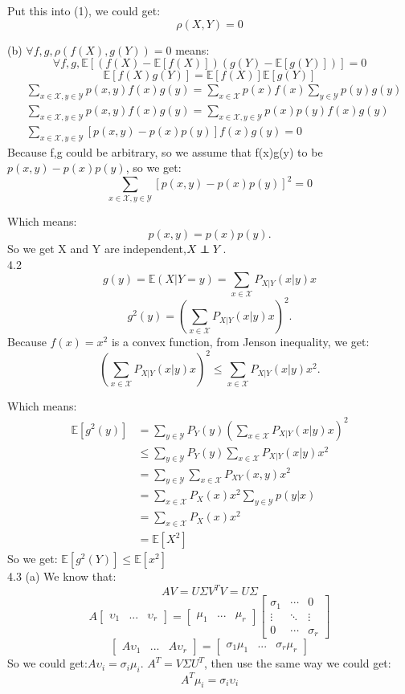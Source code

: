 \documentclass[a4paper]{article}
\begin{document}
Put this into (1), we could get:
$$
\rho(X,Y) = 0
$$

(b) $\forall f,g, \rho (f(X),g(Y)) = 0$ means:
$$
\forall f,g, \mathbb{E}[(f(X)-\mathbb{E}[f(X)])(g(Y)-\mathbb{E}[g(Y)])]= 0
$$
$$\mathbb{E}[f(X)g(Y)] = \mathbb{E}[f(X)]\mathbb{E}[g(Y)]$$
\begin{equation*}
\begin{aligned}
&\sum_{x \in \mathcal{X},y \in \mathcal{Y}} p(x,y)f(x)g(y) = \sum_{x \in \mathcal{X}} p(x)f(x)\sum_{y \in \mathcal{Y}}p(y)g(y)\\
&\sum_{x \in \mathcal{X},y \in \mathcal{Y}} p(x,y)f(x)g(y) = \sum_{x \in \mathcal{X},y \in \mathcal{Y}} p(x)p(y)f(x)g(y)\\
&\sum_{x \in \mathcal{X},y \in \mathcal{Y}} [p(x,y) - p(x)p(y)]f(x)g(y) = 0
\end{aligned}
\end{equation*}
Because f,g could be arbitrary, so we assume that f(x)g(y) to be $p(x,y) - p(x)p(y)$, so we get:
$$
\sum_{x \in \mathcal{X},y \in \mathcal{Y}} [p(x,y) - p(x)p(y)]^2 = 0
$$

Which means:
$$
p(x,y)=p(x)p(y).
$$
So we get X and Y are independent,$X \independent Y$.
$$$$
4.2
$$
g(y) = \mathbb{E}(X|Y=y) = \sum_{x \in \mathcal{X}} P_{X|Y}(x|y)x
$$
$$
g^2(y) = (\sum_{x \in \mathcal {X}} P_{X|Y}(x|y)x)^2. 
$$
Because $f(x)=x^2$ is a convex function, from Jenson inequality, we get:
$$
 (\sum_{x \in \mathcal {X}} P_{X|Y}(x|y)x)^2 \leq \sum_{x \in \mathcal{X}} P_{X|Y}(x|y)x^2.
$$

Which means:
$$
\begin{aligned}
\mathbb{E}[g^2(y)] &= \sum_{y \in \mathcal{Y}}P_Y(y)(\sum_{x \in \mathcal{X}}P_{X|Y}(x|y)x)^2\\ 
&\leq \sum_{y \in \mathcal{Y}}P_Y(y)  \sum_{x \in \mathcal{X}} P_{X|Y}(x|y)x^2\\
&=  \sum_{y \in \mathcal{Y}} \sum_{x \in \mathcal{X}} P_{XY}(x,y)x^2\\
&= \sum_{x \in \mathcal{X}} P_X(x)x^2 \sum_{y \in \mathcal{Y}} p(y|x)\\
&=\sum_{x \in \mathcal{X}} P_X(x)x^2 \\
&= \mathbb{E}[X^2]
\end{aligned}
$$
So we get: $\mathbb{E}[g^2(Y)] \leq \mathbb{E}[x^2]$
$$$$
4.3 
(a)
We know that:
$$
AV = U\Sigma V^TV = U\Sigma 
$$
$$
A\begin{bmatrix}\upsilon_1&...&\upsilon_r\end{bmatrix} = \begin{bmatrix}
\mu_1&...&\mu_r
\end{bmatrix}\begin{bmatrix}
\sigma_1&\cdots&0\\
\vdots& \ddots& \vdots\\
0&\cdots&\sigma_r
\end{bmatrix}
$$
$$
\begin{bmatrix}A\upsilon_1&...&A\upsilon_r\end{bmatrix} = \begin{bmatrix}
\sigma_1\mu_1&...&\sigma_r\mu_r
\end{bmatrix}
$$
So we could get:$A\upsilon_i = \sigma_i\mu_i$. $A^T=V\Sigma U^T$, then use the same way we could get:
$$
A^T\mu_i = \sigma_i\upsilon_i
$$
\end{document}
